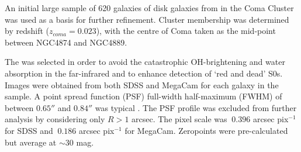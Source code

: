 An initial large sample of 620 galaxies of disk galaxies from \citet{head_dissecting_2014} in the Coma Cluster was used as a basis for further refinement. Cluster membership was determined by redshift ($z_{coma}=0.023$), with the centre of Coma taken as the mid-point between NGC4874 and NGC4889. 

The \iband was selected in order to avoid the catastrophic OH-brightening and water absorption in the far-infrared and to enhance detection of `red and dead' S0s. Images were obtained from both SDSS and MegaCam for each galaxy in the sample. A point spread function (PSF) full-width half-maximum (FWHM) of between $0.65''$ and $0.84''$ was typical \citep{head_dissecting_2014}. The PSF profile was excluded from further analysis by considering only $R > 1$ arcsec. The pixel scale was $~0.396$ arcsec pix$^{-1}$ for SDSS and $~0.186$ arcsec pix$^{-1}$ for MegaCam. Zeropoints were pre-calculated but average at $\sim 30$ mag.